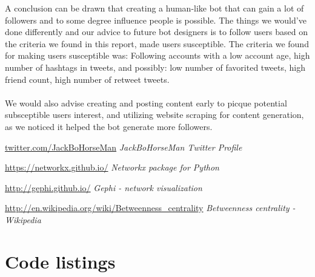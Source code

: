 \documentclass[10pt]{IEEEtran}
\begin{document}
A conclusion can be drawn that creating a human-like bot that can gain a lot of followers and to some degree influence people is possible. The things we would've done differently and our advice to future bot designers is to follow users based on the criteria we found in this report, made users susceptible. The criteria we found for making users susceptible was: Following accounts with a low account age, high number of hashtags in tweets, and possibly: low number of favorited tweets, high friend count, high number of retweet tweets.\\\\

We would also advise creating and posting content early to picque potential subsceptible users interest, and utilizing website scraping for content generation, as we noticed it helped the bot generate more followers.



\begin{thebibliography}{9}

\url{twitter.com/JackBoHorseMan}
\textit{JackBoHorseMan Twitter Profile}

\url{https://networkx.github.io/}
\textit{Networkx package for Python}

\url{http://gephi.github.io/}
\textit{Gephi - network visualization}

\url{http://en.wikipedia.org/wiki/Betweenness_centrality}
\textit{Betweenness centrality - Wikipedia}
\end{thebibliography}

\clearpage
\onecolumn
\appendices
\section{Code listings}

\lstlistoflistings
\end{document}
